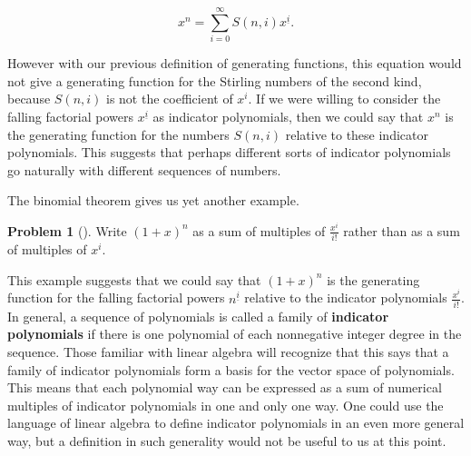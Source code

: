 \documentclass[10pt,]{book}
\newcommand{\terminology}[1]{\textbf{#1}}
\theoremstyle{plain}
\theoremstyle{definition}
\newtheorem{activity}[project]{Problem}
\theoremstyle{definition}
\numberwithin{equation}{chapter}
\begin{document}
\begin{equation*}
x^n = \sum_{i=0}^\infty S(n,i)x^{\underline{i}}.
\end{equation*}
%
\par
\hypertarget{p-2040}{}%
However with our previous definition of generating functions, this equation would not give a generating function for the Stirling numbers of the second kind, because \(S(n,i)\) is not the coefficient of \(x^i\). If we were willing to consider the falling factorial powers \(x^{\underline{i}}\) as indicator polynomials, then we could say that \(x^n\) is the generating function for the numbers \(S(n,i)\) relative to these indicator polynomials. This suggests that perhaps different sorts of indicator polynomials go naturally with different sequences of numbers.%
\par
\hypertarget{p-2041}{}%
The binomial theorem gives us yet another example.%
\begin{activity}[] \label{activity-371}
\hypertarget{p-2042}{}%
Write \((1+x)^n\) as a sum of multiples of \(\frac{x^i}{i!}\) rather than as a sum of multiples of \(x^i\).%
\end{activity}
\hypertarget{p-2044}{}%
This example suggests that we could say that \((1+x)^n\) is the generating function for the falling factorial powers \(n^{\underline{i}}\) relative to the indicator polynomials \(\frac{x^i}{i!}\). In general, a sequence of polynomials is called a family of \terminology{indicator polynomials} if there is one polynomial of each nonnegative integer degree in the sequence. Those familiar with linear algebra will recognize that this says that a family of indicator polynomials form a basis for the vector space of polynomials. This means that each polynomial way can be expressed as a sum of numerical multiples of indicator polynomials in one and only one way. One could use the language of linear algebra to define indicator polynomials in an even more general way, but a definition in such generality would not be useful to us at this point.%
\typeout{************************************************}
\typeout{************************************************}
\end{document}
